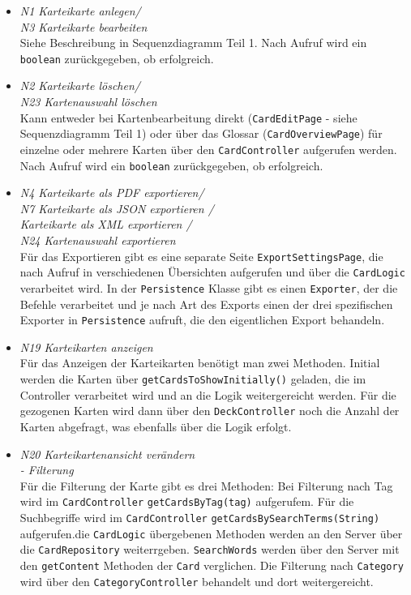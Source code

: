 \documentclass[fontsize=12pt,paper=A4,twoside]{scrartcl}
\begin{document}
    \begin{itemize}
    \item \textit{N1 Karteikarte anlegen/\\ N3 Karteikarte bearbeiten}\\ 
    Siehe Beschreibung in Sequenzdiagramm Teil 1. Nach Aufruf wird ein \texttt{boolean} zurückgegeben, ob erfolgreich.
    \item \textit{N2 Karteikarte löschen/\\ N23 Kartenauswahl löschen}\\ 
    Kann entweder bei Kartenbearbeitung direkt (\texttt{CardEditPage} - siehe Sequenzdiagramm Teil 1) oder über das Glossar (\texttt{CardOverviewPage}) 
    für einzelne oder mehrere Karten über den \texttt{CardController} aufgerufen werden. Nach Aufruf wird ein \texttt{boolean} zurückgegeben, ob erfolgreich.
    \item \textit{N4 Karteikarte als PDF exportieren/\\ 
    N7 Karteikarte als JSON exportieren /\\
    Karteikarte als XML exportieren /\\
    N24 Kartenauswahl exportieren}\\ 
    Für das Exportieren gibt es eine separate Seite \texttt{ExportSettingsPage}, die nach Aufruf 
    in verschiedenen Übersichten aufgerufen und über die \texttt{CardLogic} verarbeitet wird. In der \texttt{Persistence} Klasse gibt es einen \texttt{Exporter}, der die Befehle 
    verarbeitet und je nach Art des Exports einen der drei spezifischen Exporter in \texttt{Persistence} aufruft, die den eigentlichen Export behandeln.
    \item \textit{N19 Karteikarten anzeigen}\\ Für das Anzeigen der Karteikarten benötigt man zwei Methoden. Initial werden die
    Karten über \texttt{getCardsToShowInitially()} geladen, die im Controller verarbeitet wird und an die Logik weitergereicht werden. Für die gezogenen Karten wird
    dann über den \texttt{DeckController} noch die Anzahl der Karten abgefragt, was ebenfalls über die Logik erfolgt.
    \item \textit{N20 Karteikartenansicht verändern\\- Filterung}\\ 
    Für die Filterung der Karte gibt es drei Methoden: Bei Filterung nach Tag wird im \texttt{CardController} \texttt{getCardsByTag(tag)} aufgerufem.
    Für die Suchbegriffe wird im \texttt{CardController} \texttt{getCardsBySearchTerms(String)} aufgerufen.die \texttt{CardLogic} übergebenen Methoden werden an den Server über die \texttt{CardRepository} weiterrgeben. \texttt{SearchWords} werden über 
    den Server mit den \texttt{getContent} Methoden der \texttt{Card} verglichen.
    Die Filterung nach \texttt{Category} wird über den \texttt{CategoryController} behandelt und dort weitergereicht.
    \end{itemize}
\end{document}
